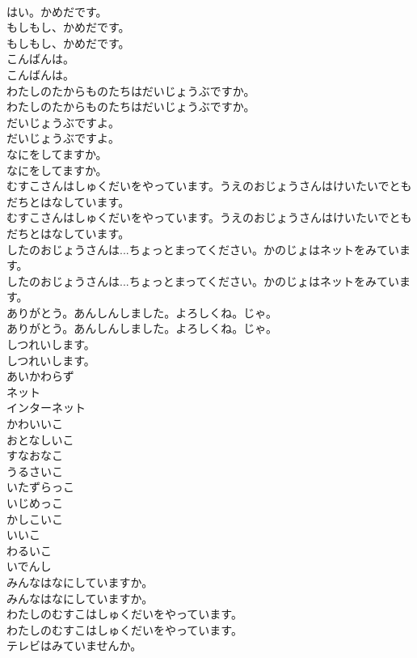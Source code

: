 \documentclass[8pt]{extreport}
\begin{document}
\begin{CJK}{UTF8}{min}
\\	はい。かめだです。 
\\	もしもし、かめだです。	
\\	もしもし、かめだです。 
\\	こんばんは。	
\\	こんばんは。 
\\	わたしのたからものたちはだいじょうぶですか。	
\\	わたしのたからものたちはだいじょうぶですか。 
\\	だいじょうぶですよ。	
\\	だいじょうぶですよ。 
\\	なにをしてますか。	
\\	なにをしてますか。 
\\	むすこさんはしゅくだいをやっています。うえのおじょうさんはけいたいでともだちとはなしています。	
\\	むすこさんはしゅくだいをやっています。うえのおじょうさんはけいたいでともだちとはなしています。 
\\	したのおじょうさんは...ちょっとまってください。かのじょはネットをみています。	
\\	したのおじょうさんは...ちょっとまってください。かのじょはネットをみています。 
\\	ありがとう。あんしんしました。よろしくね。じゃ。	
\\	ありがとう。あんしんしました。よろしくね。じゃ。 
\\	しつれいします。	
\\	しつれいします。 
\\	あいかわらず
\\	ネット
\\	インターネット
\\	かわいいこ
\\	おとなしいこ
\\	すなおなこ
\\	うるさいこ
\\	いたずらっこ
\\	いじめっこ
\\	かしこいこ
\\	いいこ
\\	わるいこ
\\	いでんし
\\	みんなはなにしていますか。	
\\	みんなはなにしていますか。 
\\	わたしのむすこはしゅくだいをやっています。	
\\	わたしのむすこはしゅくだいをやっています。 
\\	テレビはみていませんか。	

\end{CJK}
\end{document}
